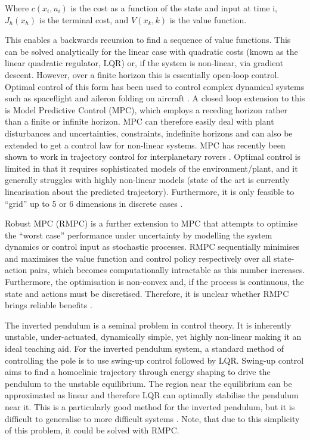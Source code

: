 \documentclass[../main.tex]{subfiles}
\begin{document}
Where $c(x_i, u_i)$ is the cost as a function of the state and input at time i, $J_h(x_h)$ is the terminal cost, and $V(x_k, k)$ is the value function.

This enables a backwards recursion to find a sequence of value functions. This can be solved analytically for the linear case with quadratic costs (known as the linear quadratic regulator, LQR) or, if the system is non-linear, via gradient descent. However, over a finite horizon this is essentially open-loop control. Optimal control of this form has been used to control complex dynamical systems such as spaceflight and aileron folding on aircraft \cite{aircraftoptcont, aileronoptcont}. A closed loop extension to this is Model Predictive Control (MPC), which employs a receding horizon rather than a finite or infinite horizon. MPC can therefore easily deal with plant disturbances and uncertainties, constraints, indefinite horizons and can also be extended to get a control law for non-linear systems. MPC has recently been shown to work in trajectory control for interplanetary rovers \cite{rovermpc}. Optimal control is limited in that it requires sophisticated models of the environment/plant, and it generally struggles with highly non-linear models (state of the art is currently linearisation about the predicted trajectory). Furthermore, it is only feasible to ``grid'' up to 5 or 6 dimensions in discrete cases \cite{4f3}.

Robust MPC (RMPC) is a further extension to MPC that attempts to optimise the ``worst case'' performance under uncertainty by modelling the system dynamics or control input as stochastic processes. RMPC sequentially minimises and maximises the value function and control policy respectively over all state-action pairs, which becomes computationally intractable as this number increases. Furthermore, the optimisation is non-convex and, if the process is continuous, the state and actions must be discretised. Therefore, it is unclear whether RMPC brings reliable benefits \cite{rmpc}.

The inverted pendulum is a seminal problem in control theory. It is inherently unstable, under-actuated, dynamically simple, yet highly non-linear making it an ideal teaching aid. For the inverted pendulum system, a standard method of controlling the pole is to use swing-up control followed by LQR. Swing-up control aims to find a homoclinic trajectory through energy shaping to drive the pendulum to the unstable equilibrium. The region near the equilibrium can be approximated as linear and therefore LQR can optimally stabilise the pendulum near it. This is a particularly good method for the inverted pendulum, but it is difficult to generalise to more difficult systems \cite{invpen}. Note, that due to this simplicity of this problem, it could be solved with RMPC.
\end{document}
